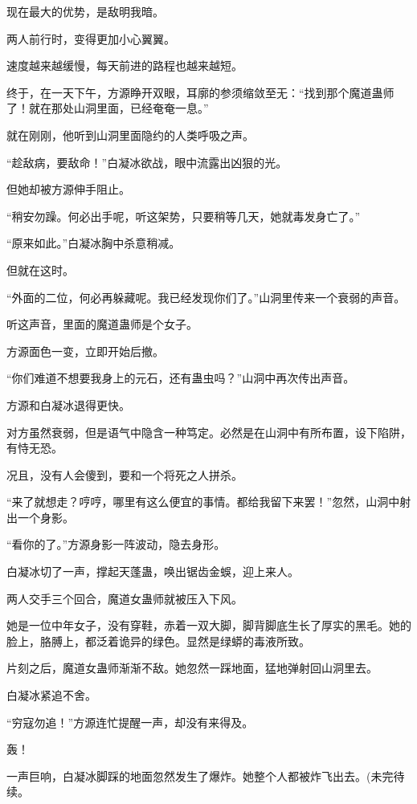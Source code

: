 \begin{this_body}
现在最大的优势，是敌明我暗。

两人前行时，变得更加小心翼翼。

速度越来越缓慢，每天前进的路程也越来越短。

终于，在一天下午，方源睁开双眼，耳廓的参须缩敛至无：“找到那个魔道蛊师了！就在那处山洞里面，已经奄奄一息。”

就在刚刚，他听到山洞里面隐约的人类呼吸之声。

“趁敌病，要敌命！”白凝冰欲战，眼中流露出凶狠的光。

但她却被方源伸手阻止。

“稍安勿躁。何必出手呢，听这架势，只要稍等几天，她就毒发身亡了。”

“原来如此。”白凝冰胸中杀意稍减。

但就在这时。

“外面的二位，何必再躲藏呢。我已经发现你们了。”山洞里传来一个衰弱的声音。

听这声音，里面的魔道蛊师是个女子。

方源面色一变，立即开始后撤。

“你们难道不想要我身上的元石，还有蛊虫吗？”山洞中再次传出声音。

方源和白凝冰退得更快。

对方虽然衰弱，但是语气中隐含一种笃定。必然是在山洞中有所布置，设下陷阱，有恃无恐。

况且，没有人会傻到，要和一个将死之人拼杀。

“来了就想走？哼哼，哪里有这么便宜的事情。都给我留下来罢！”忽然，山洞中射出一个身影。

“看你的了。”方源身影一阵波动，隐去身形。

白凝冰切了一声，撑起天蓬蛊，唤出锯齿金蜈，迎上来人。

两人交手三个回合，魔道女蛊师就被压入下风。

她是一位中年女子，没有穿鞋，赤着一双大脚，脚背脚底生长了厚实的黑毛。她的脸上，胳膊上，都泛着诡异的绿色。显然是绿蟒的毒液所致。

片刻之后，魔道女蛊师渐渐不敌。她忽然一踩地面，猛地弹射回山洞里去。

白凝冰紧追不舍。

“穷寇勿追！”方源连忙提醒一声，却没有来得及。

轰！

一声巨响，白凝冰脚踩的地面忽然发生了爆炸。她整个人都被炸飞出去。(未完待续。

\end{this_body}

